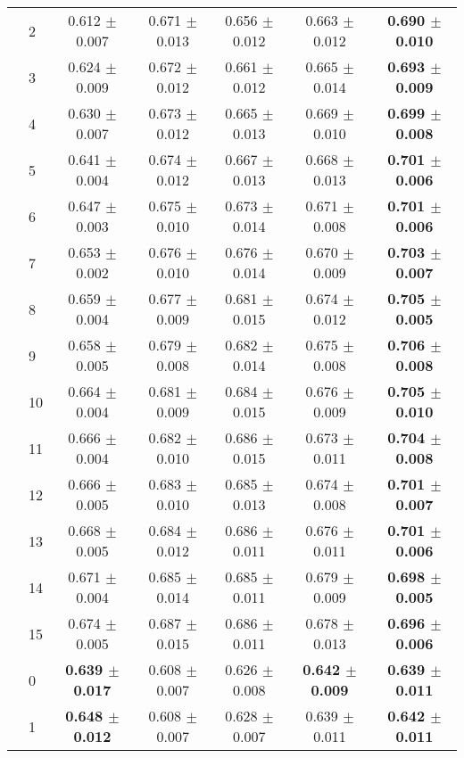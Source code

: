 \begin{table*}[t]
{\begin{tabular}{ll c c c c c}
        & 2 & 0.612 $\pm$ 0.007 & 0.671 $\pm$ 0.013 & 0.656 $\pm$ 0.012 & 0.663 $\pm$ 0.012 & \textbf{0.690 $\pm$ 0.010} \\
        & 3 & 0.624 $\pm$ 0.009 & 0.672 $\pm$ 0.012 & 0.661 $\pm$ 0.012 & 0.665 $\pm$ 0.014 & \textbf{0.693 $\pm$ 0.009} \\
        & 4 & 0.630 $\pm$ 0.007 & 0.673 $\pm$ 0.012 & 0.665 $\pm$ 0.013 & 0.669 $\pm$ 0.010 & \textbf{0.699 $\pm$ 0.008} \\
        & 5 & 0.641 $\pm$ 0.004 & 0.674 $\pm$ 0.012 & 0.667 $\pm$ 0.013 & 0.668 $\pm$ 0.013 & \textbf{0.701 $\pm$ 0.006} \\
        & 6 & 0.647 $\pm$ 0.003 & 0.675 $\pm$ 0.010 & 0.673 $\pm$ 0.014 & 0.671 $\pm$ 0.008 & \textbf{0.701 $\pm$ 0.006} \\
        & 7 & 0.653 $\pm$ 0.002 & 0.676 $\pm$ 0.010 & 0.676 $\pm$ 0.014 & 0.670 $\pm$ 0.009 & \textbf{0.703 $\pm$ 0.007} \\
        & 8 & 0.659 $\pm$ 0.004 & 0.677 $\pm$ 0.009 & 0.681 $\pm$ 0.015 & 0.674 $\pm$ 0.012 & \textbf{0.705 $\pm$ 0.005} \\
        & 9 & 0.658 $\pm$ 0.005 & 0.679 $\pm$ 0.008 & 0.682 $\pm$ 0.014 & 0.675 $\pm$ 0.008 & \textbf{0.706 $\pm$ 0.008} \\
        & 10 & 0.664 $\pm$ 0.004 & 0.681 $\pm$ 0.009 & 0.684 $\pm$ 0.015 & 0.676 $\pm$ 0.009 & \textbf{0.705 $\pm$ 0.010} \\
        & 11 & 0.666 $\pm$ 0.004 & 0.682 $\pm$ 0.010 & 0.686 $\pm$ 0.015 & 0.673 $\pm$ 0.011 & \textbf{0.704 $\pm$ 0.008} \\
        & 12 & 0.666 $\pm$ 0.005 & 0.683 $\pm$ 0.010 & 0.685 $\pm$ 0.013 & 0.674 $\pm$ 0.008 & \textbf{0.701 $\pm$ 0.007} \\
        & 13 & 0.668 $\pm$ 0.005 & 0.684 $\pm$ 0.012 & 0.686 $\pm$ 0.011 & 0.676 $\pm$ 0.011 & \textbf{0.701 $\pm$ 0.006} \\
        & 14 & 0.671 $\pm$ 0.004 & 0.685 $\pm$ 0.014 & 0.685 $\pm$ 0.011 & 0.679 $\pm$ 0.009 & \textbf{0.698 $\pm$ 0.005} \\
        & 15 & 0.674 $\pm$ 0.005 & 0.687 $\pm$ 0.015 & 0.686 $\pm$ 0.011 & 0.678 $\pm$ 0.013 & \textbf{0.696 $\pm$ 0.006} \\
\midrule
\assist{} & 0 & \textbf{0.639 $\pm$ 0.017} & 0.608 $\pm$ 0.007 & 0.626 $\pm$ 0.008 & \textbf{0.642 $\pm$ 0.009} & \textbf{0.639 $\pm$ 0.011} \\
        & 1 & \textbf{0.648 $\pm$ 0.012} & 0.608 $\pm$ 0.007 & 0.628 $\pm$ 0.007 & 0.639 $\pm$ 0.011 & \textbf{0.642 $\pm$ 0.011} \\

\end{tabular}}
\end{table*}
